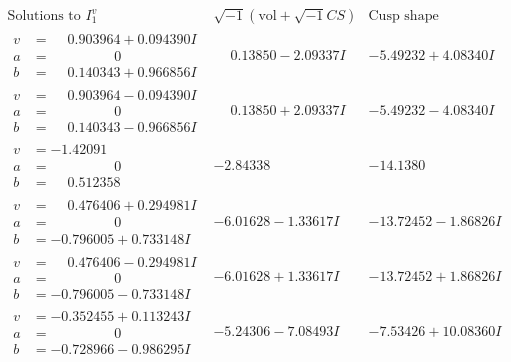 \documentclass[1p]{elsarticle_modified}
\theoremstyle{definition}
\newcommand{\I}{\sqrt{-1}}
\begin{document}
$$\begin{array}{c|c|c}  
\text{Solutions to }I^v_{1}& \I (\text{vol} + \sqrt{-1}CS) & \text{Cusp shape}\\
 \hline 
\begin{aligned}
v &= \phantom{-}0.903964 + 0.094390 I \\
a &= \phantom{-0.000000 } 0 \\
b &= \phantom{-}0.140343 + 0.966856 I\end{aligned}
 & \phantom{-}0.13850 - 2.09337 I & -5.49232 + 4.08340 I \\ \hline\begin{aligned}
v &= \phantom{-}0.903964 - 0.094390 I \\
a &= \phantom{-0.000000 } 0 \\
b &= \phantom{-}0.140343 - 0.966856 I\end{aligned}
 & \phantom{-}0.13850 + 2.09337 I & -5.49232 - 4.08340 I \\ \hline\begin{aligned}
v &= -1.42091\phantom{ +0.000000I} \\
a &= \phantom{-0.000000 } 0 \\
b &= \phantom{-}0.512358\phantom{ +0.000000I}\end{aligned}
 & -2.84338\phantom{ +0.000000I} & -14.1380\phantom{ +0.000000I} \\ \hline\begin{aligned}
v &= \phantom{-}0.476406 + 0.294981 I \\
a &= \phantom{-0.000000 } 0 \\
b &= -0.796005 + 0.733148 I\end{aligned}
 & -6.01628 - 1.33617 I & -13.72452 - 1.86826 I \\ \hline\begin{aligned}
v &= \phantom{-}0.476406 - 0.294981 I \\
a &= \phantom{-0.000000 } 0 \\
b &= -0.796005 - 0.733148 I\end{aligned}
 & -6.01628 + 1.33617 I & -13.72452 + 1.86826 I \\ \hline\begin{aligned}
v &= -0.352455 + 0.113243 I \\
a &= \phantom{-0.000000 } 0 \\
b &= -0.728966 - 0.986295 I\end{aligned}
 & -5.24306 - 7.08493 I & -7.53426 + 10.08360 I \\ \hline\begin{aligned}

\end{aligned}
\end{array}$$
\end{document}
